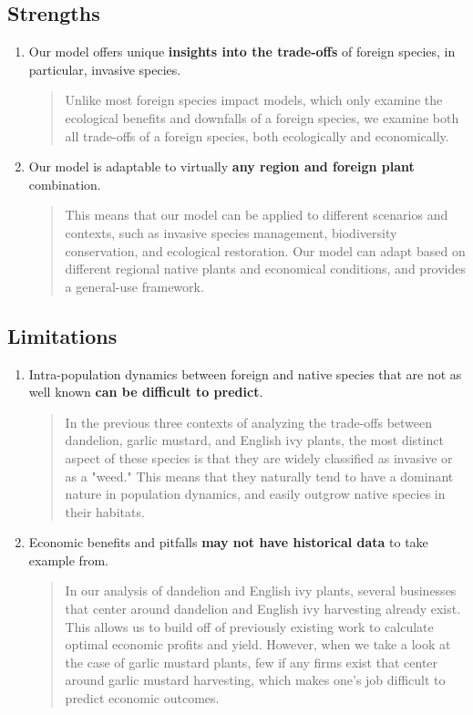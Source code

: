 \subsection{Strengths}
\begin{enumerate}
    \item Our model offers unique\textbf{ insights into the trade-offs} of foreign species, in particular, invasive species.
    \begin{quote}
        Unlike most foreign species impact models, which only examine the ecological benefits and downfalls of a foreign species, we examine both all trade-offs of a foreign species, both ecologically and economically.
    \end{quote}
    \item Our model is adaptable to virtually \textbf{any region and foreign plant} combination.
    \begin{quote}
        This means that our model can be applied to different scenarios and contexts, such as invasive species management, biodiversity conservation, and ecological restoration. Our model can adapt based on different regional native plants and economical conditions, and provides a general-use framework.
    \end{quote}
\end{enumerate}
\subsection{Limitations}
\begin{enumerate}
\item Intra-population dynamics between foreign and native species that are not as well known \textbf{can be difficult to predict}.
    \begin{quote}
     In the previous three contexts of analyzing the trade-offs between dandelion, garlic mustard, and English ivy plants, the most distinct aspect of these species is that they are widely classified as invasive or as a "weed." This means that they naturally tend to have a dominant nature in population dynamics, and easily outgrow native species in their habitats.
    \end{quote}
\item Economic benefits and pitfalls \textbf{may not have historical data} to take example from.
\begin{quote}
    In our analysis of dandelion and English ivy plants, several businesses that center around dandelion and English ivy harvesting already exist. This allows us to build off of previously existing work to calculate optimal economic profits and yield. However, when we take a look at the case of garlic mustard plants, few if any firms exist that center around garlic mustard harvesting, which makes one's job difficult to predict economic outcomes.
\end{quote}
    
\end{enumerate}

